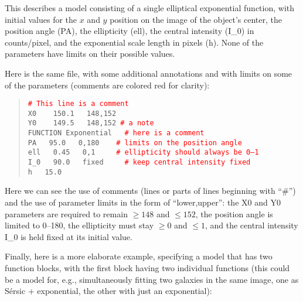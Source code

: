 \documentclass[10pt,a4paper,article]{memoir}
\newcommand{\red}{\textcolor{red}}
\begin{document}
This describes a model consisting of a single elliptical exponential
function, with initial values for the $x$ and $y$ position on the image
of the object's center, the position angle (PA), the ellipticity (ell),
the central intensity (I\_0) in counts/pixel, and the exponential scale
length in pixels (h). None of the parameters have limits on their
possible values.

Here is the same file, with some additional annotations and with limits on
some of the parameters (comments are colored red for clarity):

\begin{quote}
  \texttt{\red{\# This line is a comment}}\\
  
  \texttt{X0 ~~   150.1 ~  148,152}\\
  \texttt{Y0 ~~   149.5 ~  148,152         \red{\# a note}}\\
  \texttt{FUNCTION   Exponential  ~ \red{\# here is a comment}}\\
  \texttt{PA  ~  95.0  ~ 0,180   ~~   \red{\# limits on the position angle}}\\
  \texttt{ell  ~  0.45 ~ 0,1     ~~~ \red{\# ellipticity should always be 0--1}}\\
  \texttt{I\_0 ~  90.0 ~  fixed ~~~ \red{\# keep central intensity fixed}}\\
  \texttt{h    ~ 15.0}\\
\end{quote}

Here we can see the use of comments (lines or parts of lines beginning with
``\#'') and the use of parameter limits in the form of ``lower,upper'': the X0
and Y0 parameters are required to remain $\geq 148$ and $\leq 152$, the position
angle is limited to 0--180, the ellipticity must stay $\geq 0$ and $\leq 1$, and
the central intensity I\_0 is held fixed at its initial value.

Finally, here is a more elaborate example, specifying a model that has two
function blocks, with the first block having two individual functions (this
could be a model for, e.g., simultaneously fitting two galaxies in the same
image, one as S\'ersic + exponential, the other with just an exponential):
\end{document}
